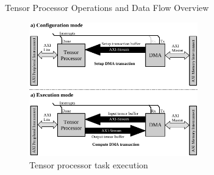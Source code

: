 \begin{frame}{Tensor Processor Operations and Data Flow Overview}
	
	\begin{figure}
		\includegraphics[width=0.65\textwidth]{../figures/task_execution.pdf}
		\caption{Tensor processor task execution}
	\end{figure}
	
\end{frame}



